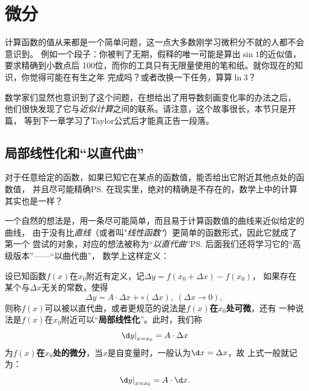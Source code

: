 \section{微分}

计算函数的值从来都是一个简单问题，这一点大多数刚学习微积分不就的人都不会意识到。
例如一个段子：你被判了无期，假释的唯一可能是算出$\sin 1$的近似值，要求精确到小数点后
100位，而你的工具只有无限量使用的笔和纸。就你现在的知识，你觉得可能在有生之年
完成吗？或者改换一下任务，算算$\ln 3$？

数学家们显然也意识到了这个问题，在想给出了用导数刻画变化率的办法之后，
他们很快发现了它与{\it 近似计算}之间的联系。请注意，这个故事很长，本节只是开篇，
等到下一章学习了Taylor公式后才能真正告一段落。

\subsection{局部线性化和“以直代曲”}

对于任意给定的函数，如果已知它在某点的函数值，能否给出它附近其他点处的函数值，
并且尽可能精确\ps{在现实里，绝对的精确是不存在的，数学上中的计算其实也是一样}？

一个自然的想法是，用一条尽可能简单，而且易于计算函数值的曲线来近似给定的曲线，
由于没有比{\it 直线}（或者叫"{\it 线性函数"}）更简单的函数形式，因此它就成了第一个
尝试的对象，对应的想法被称为“{\it 以直代曲}”\ps{后面我们还将学习它的“高级版本”——“以曲代曲”}，
数学上这样定义：
\begin{thx}
	设已知函数$f(x)$在$x_0$附近有定义，记$\Delta y=f(x_0+\Delta x)-f(x_0)$，
	如果存在某个与$\Delta x$无关的常数，使得
	$$\Delta y=A\cdot\Delta x+\circ(\Delta x),\;(\Delta x\to 0),$$
	则称$f(x)$可以被以直代曲，或者更规范的说法是{\bf $f(x)$在$x_0$处可微}，还有
	一种说法是$f(x)$在$x_0$附近可以“{\bf 局部线性化}”。此时，我们称
	$$\left.\d y\right|_{x=x_0}=A\cdot\Delta x$$
	为{\bf $f(x)$在$x_0$处的微分}，当$x$是自变量时，一般认为$\d x=\Delta x$，故
	上式一般就记为：
	$$\left.\d y\right|_{x=x_0}=A\cdot\d x.$$
\end{thx}

